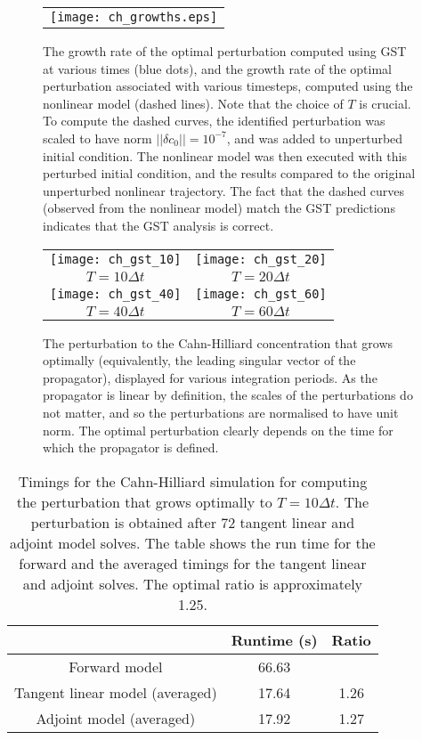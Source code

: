 \documentclass{siamltex}
\begin{document}
\begin{figure}
  \centering
  \begin{tabular}{c}
    \texttt{[image: ch\_growths.eps]}
  \end{tabular}
  \caption{The growth rate of the optimal perturbation computed using GST at various times (blue
  dots), and the growth rate of the optimal perturbation associated with various timesteps, computed
using the nonlinear model (dashed lines). Note that the choice of $T$ is crucial. To compute the dashed curves, the identified perturbation
was scaled to have norm $\left|\left| \delta c_0 \right| \right| = 10^{-7}$, and was added to unperturbed initial 
condition. The nonlinear model was then executed with this perturbed initial condition, and the
results compared to the original unperturbed nonlinear trajectory. The fact that the dashed curves
(observed from the nonlinear model) match the GST predictions indicates that the GST analysis is
correct.}
  \label{fig:ch_growths}
\end{figure}

\begin{figure}
  \centering
  \begin{tabular}{cc}
    \texttt{[image: ch\_gst\_10]} & \texttt{[image: ch\_gst\_20]}
    \\
    $T = 10\Delta t$ & $T = 20 \Delta t$
    \\
    \texttt{[image: ch\_gst\_40]} & \texttt{[image: ch\_gst\_60]}
    \\
    $T = 40\Delta t$ & $T = 60 \Delta t$
  \end{tabular}
  \caption{The perturbation to the Cahn-Hilliard concentration that grows optimally (equivalently, the leading singular vector of
  the propagator), displayed for various integration periods. As the propagator is linear by definition, the scales of the perturbations
  do not matter, and so the perturbations are normalised to have unit norm. The optimal perturbation clearly depends on the
  time for which the propagator is defined.}
  \label{fig:ch_gst}
\end{figure}
\begin{table}[t]
\centering
\begin{tabular}{ccc}
\toprule
       & Runtime (s) & Ratio \\
\midrule
Forward model & 66.63  &     \\
Tangent linear model (averaged) & 17.64 & 1.26 \\
Adjoint model (averaged) & 17.92  & 1.27 \\
\bottomrule
\end{tabular}
\caption{Timings for the Cahn-Hilliard simulation for computing the perturbation that grows optimally to $T = 10\Delta t$. 
  The perturbation is obtained after $72$ tangent linear and adjoint model solves. 
 The table shows the run time for the forward and the averaged timings for the tangent linear and adjoint solves. The optimal ratio is
 approximately 1.25.}
\label{tab:cahn-hilliard-timings}
\end{table}
\end{document}
